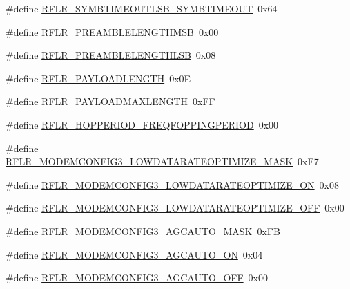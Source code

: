 \begin{DoxyCompactItemize}
\item 
\#define \mbox{\hyperlink{sx1276_regs-_lo_ra_8h_a7c716a3e2f80da48b0d56525b7559fe2}{R\+F\+L\+R\+\_\+\+S\+Y\+M\+B\+T\+I\+M\+E\+O\+U\+T\+L\+S\+B\+\_\+\+S\+Y\+M\+B\+T\+I\+M\+E\+O\+UT}}~0x64
\item 
\#define \mbox{\hyperlink{sx1276_regs-_lo_ra_8h_a2cc4ec3c5fefaf4cb485fe1e2b02457a}{R\+F\+L\+R\+\_\+\+P\+R\+E\+A\+M\+B\+L\+E\+L\+E\+N\+G\+T\+H\+M\+SB}}~0x00
\item 
\#define \mbox{\hyperlink{sx1276_regs-_lo_ra_8h_a5da40c14ea4b9e74e51eaa3f889d7194}{R\+F\+L\+R\+\_\+\+P\+R\+E\+A\+M\+B\+L\+E\+L\+E\+N\+G\+T\+H\+L\+SB}}~0x08
\item 
\#define \mbox{\hyperlink{sx1276_regs-_lo_ra_8h_a0992f3f019223ffe14d03e6953678ede}{R\+F\+L\+R\+\_\+\+P\+A\+Y\+L\+O\+A\+D\+L\+E\+N\+G\+TH}}~0x0E
\item 
\#define \mbox{\hyperlink{sx1276_regs-_lo_ra_8h_ae2ef2578d9d578322e66d92d1a3d2b4f}{R\+F\+L\+R\+\_\+\+P\+A\+Y\+L\+O\+A\+D\+M\+A\+X\+L\+E\+N\+G\+TH}}~0x\+FF
\item 
\#define \mbox{\hyperlink{sx1276_regs-_lo_ra_8h_aedf4649ce9c41869658cdb3a9ea111af}{R\+F\+L\+R\+\_\+\+H\+O\+P\+P\+E\+R\+I\+O\+D\+\_\+\+F\+R\+E\+Q\+F\+O\+P\+P\+I\+N\+G\+P\+E\+R\+I\+OD}}~0x00
\item 
\#define \mbox{\hyperlink{sx1276_regs-_lo_ra_8h_acc0d112fd4a7d3bf0325e1e17701702c}{R\+F\+L\+R\+\_\+\+M\+O\+D\+E\+M\+C\+O\+N\+F\+I\+G3\+\_\+\+L\+O\+W\+D\+A\+T\+A\+R\+A\+T\+E\+O\+P\+T\+I\+M\+I\+Z\+E\+\_\+\+M\+A\+SK}}~0x\+F7
\item 
\#define \mbox{\hyperlink{sx1276_regs-_lo_ra_8h_a1def60d210d6a0ec8ea83f3137db0db3}{R\+F\+L\+R\+\_\+\+M\+O\+D\+E\+M\+C\+O\+N\+F\+I\+G3\+\_\+\+L\+O\+W\+D\+A\+T\+A\+R\+A\+T\+E\+O\+P\+T\+I\+M\+I\+Z\+E\+\_\+\+ON}}~0x08
\item 
\#define \mbox{\hyperlink{sx1276_regs-_lo_ra_8h_aba5ba3dcc0dca5012f459a1328e83e59}{R\+F\+L\+R\+\_\+\+M\+O\+D\+E\+M\+C\+O\+N\+F\+I\+G3\+\_\+\+L\+O\+W\+D\+A\+T\+A\+R\+A\+T\+E\+O\+P\+T\+I\+M\+I\+Z\+E\+\_\+\+O\+FF}}~0x00
\item 
\#define \mbox{\hyperlink{sx1276_regs-_lo_ra_8h_a7436ec112d8acb4c70d2ff02a0e0424c}{R\+F\+L\+R\+\_\+\+M\+O\+D\+E\+M\+C\+O\+N\+F\+I\+G3\+\_\+\+A\+G\+C\+A\+U\+T\+O\+\_\+\+M\+A\+SK}}~0x\+FB
\item 
\#define \mbox{\hyperlink{sx1276_regs-_lo_ra_8h_ac3e41f96acc26c049d2ba14aaf97173a}{R\+F\+L\+R\+\_\+\+M\+O\+D\+E\+M\+C\+O\+N\+F\+I\+G3\+\_\+\+A\+G\+C\+A\+U\+T\+O\+\_\+\+ON}}~0x04
\item 
\#define \mbox{\hyperlink{sx1276_regs-_lo_ra_8h_ab2d2c93d68a0a68d8b6dbdbf49590245}{R\+F\+L\+R\+\_\+\+M\+O\+D\+E\+M\+C\+O\+N\+F\+I\+G3\+\_\+\+A\+G\+C\+A\+U\+T\+O\+\_\+\+O\+FF}}~0x00

\end{DoxyCompactItemize}
